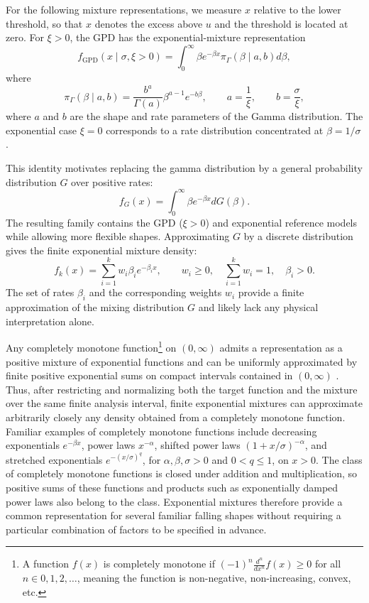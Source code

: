 \documentclass[a4paper,11pt]{article}
\begin{document}
For the following mixture representations, we measure $x$ relative to the lower threshold, so that $x$ denotes the excess above $u$ and the threshold is located at zero. For $\xi>0$, the GPD has the exponential-mixture representation
$$
f_{\text{GPD}}(x\mid\sigma,\xi>0)
=\int_0^\infty \beta e^{-\beta x}
\pi_\Gamma(\beta\mid a,b) d\beta,
$$
where
$$
\pi_\Gamma(\beta\mid a,b)
=\frac{b^a}{\Gamma(a)}\beta^{a-1}e^{-b\beta},
\qquad
a=\frac{1}{\xi},\qquad b=\frac{\sigma}{\xi},
$$
where $a$ and $b$ are the shape and rate parameters of the Gamma distribution. The exponential case $\xi=0$ corresponds to a rate distribution concentrated at $\beta=1/\sigma$.

This identity motivates replacing the gamma distribution by a general probability distribution $G$ over positive rates:
$$
f_G(x)=\int_0^\infty \beta e^{-\beta x} dG(\beta).
$$
The resulting family contains the GPD ($\xi>0$) and exponential reference models while allowing more flexible shapes. Approximating $G$ by a discrete distribution gives the finite exponential mixture density:
$$
f_k(x)=\sum_{i=1}^{k}w_i\beta_i e^{-\beta_i x},
\qquad
w_i\geq0,\quad \sum_{i=1}^{k}w_i=1,\quad \beta_i>0.
$$
The set of rates $\beta_i$ and the corresponding weights $w_i$ provide a finite approximation of the mixing distribution $G$ and likely lack any physical interpretation alone.

Any completely monotone function\footnote{\label{cm_def}A function $f(x)$ is completely monotone if $(-1)^n \frac{d^n}{dx^n}f(x) \geq 0$ for all $n \in {0,1,2,\ldots}$, meaning the function is non-negative, non-increasing, convex, etc.} on $(0,\infty)$ admits a representation as a positive mixture of exponential functions \cite{bernstein} and can be uniformly approximated by finite positive exponential sums on compact intervals contained in $(0,\infty)$ \cite{McGlinn_1978}. Thus, after restricting and normalizing both the target function and the mixture over the same finite analysis interval, finite exponential mixtures can approximate arbitrarily closely any density obtained from a completely monotone function. Familiar examples of completely monotone functions include decreasing exponentials $e^{-\beta x}$, power laws $x^{-\alpha}$, shifted power laws $(1+x/\sigma)^{-\alpha}$, and stretched exponentials $e^{-(x/\sigma)^q}$, for $\alpha,\beta,\sigma>0$ and $0<q\leq1$, on $x>0$. The class of completely monotone functions is closed under addition and multiplication, so positive sums of these functions and products such as exponentially damped power laws also belong to the class. Exponential mixtures therefore provide a common representation for several familiar falling shapes without requiring a particular combination of factors to be specified in advance.
\end{document}
